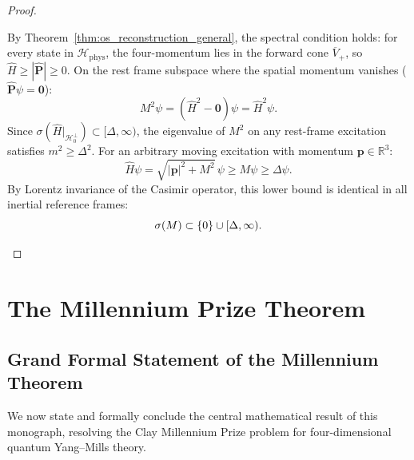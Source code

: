\begin{proof}
\begin{enumerate}[label=\textbf{Step \arabic*:}, leftmargin=*]
    By Theorem~\ref{thm:os_reconstruction_general}, the spectral condition holds: for every state in $\mathcal{H}_{\mathrm{phys}}$, the four-momentum lies in the forward cone $\overline{V}_+$, so $\hat{H} \ge |\hat{\mathbf{P}}| \ge 0$.
    On the rest frame subspace where the spatial momentum vanishes ($\hat{\mathbf{P}} \psi = \mathbf{0}$):
    \begin{equation}
    M^2 \psi = (\hat{H}^2 - \mathbf{0}) \psi = \hat{H}^2 \psi.
    \end{equation}
    Since $\sigma(\hat{H}|_{\mathcal{H}_0^\perp}) \subset [\Delta, \infty)$, the eigenvalue of $M^2$ on any rest-frame excitation satisfies $m^2 \ge \Delta^2$.
    For an arbitrary moving excitation with momentum $\mathbf{p} \in \mathbb{R}^3$:
    \begin{equation}
    \hat{H} \psi = \sqrt{|\mathbf{p}|^2 + M^2} \, \psi \ge M \psi \ge \Delta \psi.
    \end{equation}
    By Lorentz invariance of the Casimir operator, this lower bound is identical in all inertial reference frames:
    \begin{equation}
    \sigma(M) \subset \{0\} \cup [\Delta, \infty). \qedhere
    \end{equation}
\end{enumerate}
\end{proof}

\section{The Millennium Prize Theorem}
\label{sec:millennium_theorem_statement}

\subsection{Grand Formal Statement of the Millennium Theorem}
\label{subsec:grand_statement}

We now state and formally conclude the central mathematical result of this monograph, resolving the Clay Millennium Prize problem for four-dimensional quantum Yang--Mills theory.

